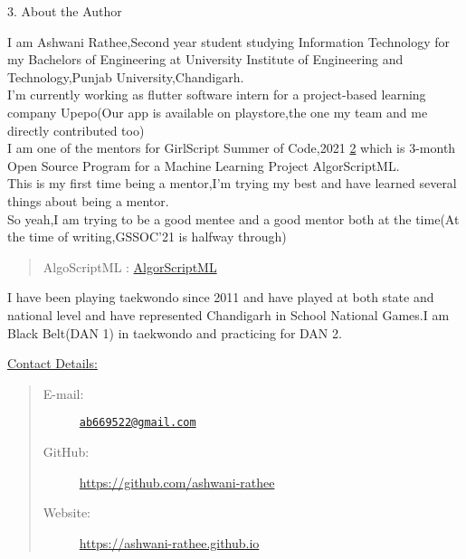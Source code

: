 \Huge
\textsf{3. About the Author}

\vspace{0.5cm}
\large
I am \textsf{Ashwani Rathee},Second year student studying Information Technology for my Bachelors of Engineering at University Institute of Engineering and Technology,Punjab University,Chandigarh. \\
I'm currently working as flutter software intern for a project-based learning company Upepo(Our app is available on playstore,the one my team and me directly contributed too)\\

I am one of the mentors for GirlScript Summer of Code,2021 \href{https://gssoc.girlscript.tech/}{2} which is 3-month Open Source Program for a Machine Learning Project AlgorScriptML.\\
This is my first time being a mentor,I'm trying my best and have learned several things about being a mentor.\\

So yeah,I am trying to be a good mentee and a good mentor both at the time(At the time of writing,GSSOC'21 is halfway through)
\begin{quote}
    \begin{description}
      \item AlgoScriptML : \href{https://github.com/Algo-Phantoms/Algo-ScriptML}{AlgorScriptML}
    \end{description}
\end{quote}

I have been playing taekwondo since 2011 and have played at both state and national level and have represented Chandigarh in School National Games.I am Black Belt(DAN 1) in taekwondo and practicing for DAN 2.

\vspace{0.5cm}
\Large
\underline{\textsf{Contact Details:}}

\large
\begin{quote}
  \begin{description}
    \item [E-mail: ] {\href{ mailto:ab669522@gmail.com}
      {\nolinkurl{ab669522@gmail.com}}}
    \item [GitHub:  ] {\url{https://github.com/ashwani-rathee}}
    \item [Website: ] {\url{https://ashwani-rathee.github.io}}
  \end{description}
\end{quote}

